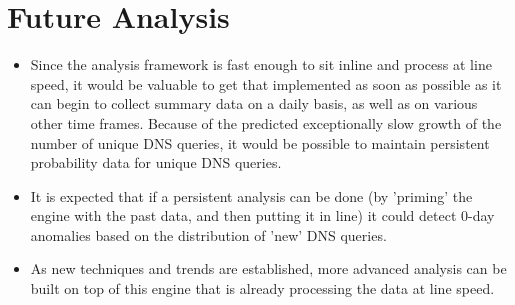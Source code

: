 \documentclass{article}
\theoremstyle{remark}
\theoremstyle{definition}
\theoremstyle{definition}
\theoremstyle{definition}
\begin{document}
\section{Future Analysis}
\begin{itemize}
\item Since the analysis framework is fast enough to sit inline and process at line speed, it would be valuable to get that implemented as soon as possible as it can begin to collect summary data on a daily basis, as well as on various other time frames. Because of the predicted exceptionally slow growth of the number of unique DNS queries, it would be possible to maintain persistent probability data for unique DNS queries.

\item It is expected that if a persistent analysis can be done (by 'priming' the engine with the past data, and then putting it in line) it could detect 0-day anomalies based on the distribution of 'new' DNS queries.

\item As new techniques and trends are established, more advanced analysis can be built on top of this engine that is already processing the data at line speed.
\end{itemize}

% 
\end{document}

